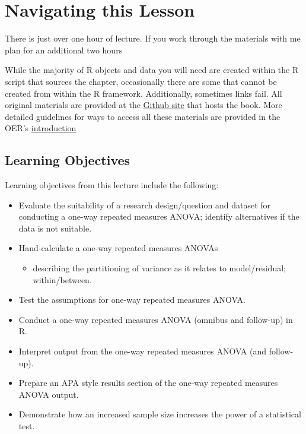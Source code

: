 \documentclass[
  11pt,
]{book}
\providecommand{\tightlist}{%
  \setlength{\itemsep}{0pt}\setlength{\parskip}{0pt}}
\begin{document}
\hypertarget{navigating-this-lesson-7}{%
\section{Navigating this Lesson}\label{navigating-this-lesson-7}}

There is just over one hour of lecture. If you work through the materials with me plan for an additional two hours

While the majority of R objects and data you will need are created within the R script that sources the chapter, occasionally there are some that cannot be created from within the R framework. Additionally, sometimes links fail. All original materials are provided at the \href{https://github.com/lhbikos/ReCenterPsychStats}{Github site} that hosts the book. More detailed guidelines for ways to access all these materials are provided in the OER's \protect\hyperlink{ReCintro}{introduction}

\hypertarget{learning-objectives-7}{%
\subsection{Learning Objectives}\label{learning-objectives-7}}

Learning objectives from this lecture include the following:

\begin{itemize}
\tightlist
\item
  Evaluate the suitability of a research design/question and dataset for conducting a one-way repeated measures ANOVA; identify alternatives if the data is not suitable.
\item
  Hand-calculate a one-way repeated measures ANOVAs

  \begin{itemize}
  \tightlist
  \item
    describing the partitioning of variance as it relates to model/residual; within/between.
  \end{itemize}
\item
  Test the assumptions for one-way repeated measures ANOVA.
\item
  Conduct a one-way repeated measures ANOVA (omnibus and follow-up) in R.
\item
  Interpret output from the one-way repeated measures ANOVA (and follow-up).
\item
  Prepare an APA style results section of the one-way repeated measures ANOVA output.
\item
  Demonstrate how an increased sample size increases the power of a statistical test.
\end{itemize}
\end{document}
